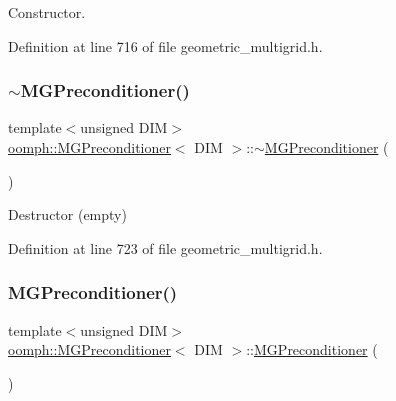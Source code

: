 Constructor. 



Definition at line 716 of file geometric\+\_\+multigrid.\+h.

\mbox{\label{classoomph_1_1MGPreconditioner_ae11d01b071f771150fcc608cee379bf1}} 
\subsubsection{\texorpdfstring{$\sim$\+M\+G\+Preconditioner()}{~MGPreconditioner()}}
{\footnotesize\ttfamily template$<$unsigned D\+IM$>$ \\
\hyperlink{classoomph_1_1MGPreconditioner}{oomph\+::\+M\+G\+Preconditioner}$<$ D\+IM $>$\+::$\sim$\hyperlink{classoomph_1_1MGPreconditioner}{M\+G\+Preconditioner} (\begin{DoxyParamCaption}{ }\end{DoxyParamCaption})\hspace{0.3cm}{\ttfamily [inline]}}



Destructor (empty) 



Definition at line 723 of file geometric\+\_\+multigrid.\+h.

\mbox{\label{classoomph_1_1MGPreconditioner_aaa38a856cda8e4b6ee612bc9d4ad1509}} 
\subsubsection{\texorpdfstring{M\+G\+Preconditioner()}{MGPreconditioner()}\hspace{0.1cm}{\footnotesize\ttfamily [2/2]}}
{\footnotesize\ttfamily template$<$unsigned D\+IM$>$ \\
\hyperlink{classoomph_1_1MGPreconditioner}{oomph\+::\+M\+G\+Preconditioner}$<$ D\+IM $>$\+::\hyperlink{classoomph_1_1MGPreconditioner}{M\+G\+Preconditioner} (\begin{DoxyParamCaption}\item[{const \hyperlink{classoomph_1_1MGPreconditioner}{M\+G\+Preconditioner}$<$ D\+IM $>$ \&}]{ }\end{DoxyParamCaption})\hspace{0.3cm}{\ttfamily [inline]}}




